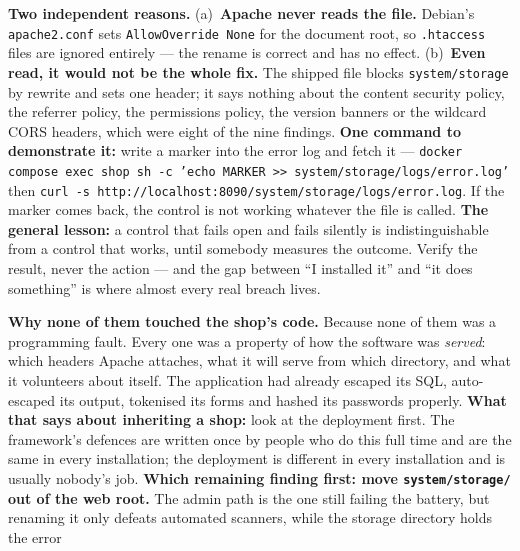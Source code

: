 \begin{ans}
  \item \textbf{Two independent reasons.} (a)~\textbf{Apache never reads the
        file.} Debian's \texttt{apache2.conf} sets \texttt{AllowOverride None}
        for the document root, so \texttt{.htaccess} files are ignored
        entirely --- the rename is correct and has no effect. (b)~\textbf{Even
        read, it would not be the whole fix.} The shipped file blocks
        \texttt{system/storage} by rewrite and sets one header; it says nothing
        about the content security policy, the referrer policy, the permissions
        policy, the version banners or the wildcard CORS headers, which were
        eight of the nine findings. \textbf{One command to demonstrate it:}
        write a marker into the error log and fetch it ---
        \texttt{docker compose exec shop sh -c 'echo MARKER >>
        system/storage/logs/error.log'} then \texttt{curl -s
        http://localhost:8090/system/storage/logs/error.log}. If the marker
        comes back, the control is not working whatever the file is called.
        \textbf{The general lesson:} a control that fails open and fails
        silently is indistinguishable from a control that works, until
        somebody measures the outcome. Verify the result, never the action ---
        and the gap between ``I installed it'' and ``it does something'' is
        where almost every real breach lives.
  \item \textbf{Why none of them touched the shop's code.} Because none of them
        was a programming fault. Every one was a property of how the software
        was \emph{served}: which headers Apache attaches, what it will serve
        from which directory, and what it volunteers about itself. The
        application had already escaped its SQL, auto-escaped its output,
        tokenised its forms and hashed its passwords properly. \textbf{What
        that says about inheriting a shop:} look at the deployment first. The
        framework's defences are written once by people who do this full time
        and are the same in every installation; the deployment is different in
        every installation and is usually nobody's job. \textbf{Which remaining
        finding first: move \texttt{system/storage/} out of the web root.} The
        admin path is the one still failing the battery, but renaming it only
        defeats automated scanners, while the storage directory holds the error

\end{ans}
